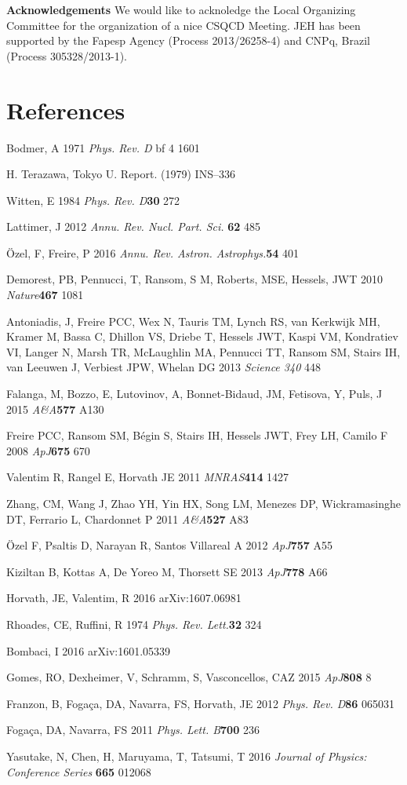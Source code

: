 \documentclass[a4paper]{jpconf}
\begin{document}
\bigskip
\noindent
{\bf Acknowledgements}
We would like to acknoledge the Local Organizing Committee for the organization of a nice CSQCD Meeting. JEH has been 
supported by the Fapesp Agency (Process 2013/26258-4) and CNPq, Brazil (Process 305328/2013-1).

\section*{References}

\noindent
[1] Bodmer, A 1971 {\it Phys. Rev. D} {bf 4} 1601

\noindent
[2] H. Terazawa, Tokyo U. Report. (1979) INS–336

\noindent
[3] Witten, E 1984 {\it Phys. Rev. D}{\bf 30} 272

\noindent
[4] Lattimer, J 2012 {\it Annu. Rev. Nucl. Part. Sci.} {\bf 62} 485 

\noindent
[5] \"Ozel, F, Freire, P 2016 {\it Annu. Rev. Astron. Astrophys.}{\bf 54} 401

\noindent
[6] Demorest, PB, Pennucci, T, Ransom, S M, Roberts, MSE, Hessels, JWT 2010 {\it Nature}{\bf 467} 1081

\noindent
[7] Antoniadis, J, Freire PCC, Wex N, Tauris TM, Lynch RS, van Kerkwijk MH, Kramer M, Bassa C, 
Dhillon VS, Driebe T, Hessels JWT, Kaspi VM, Kondratiev VI, Langer N, Marsh TR, McLaughlin MA, 
Pennucci TT, Ransom SM, Stairs IH, van Leeuwen J, Verbiest JPW, Whelan DG 2013 {\it Science 340} 448

\noindent
[8] Falanga, M, Bozzo, E, Lutovinov, A, Bonnet-Bidaud, JM, Fetisova, Y, Puls, J 2015 {\it A\&A}{\bf 577} A130

\noindent
[9] Freire PCC, Ransom SM, Bégin S, Stairs IH, Hessels JWT, Frey LH, Camilo F 2008 {\it ApJ}{\bf 675} 670

\noindent
[10] Valentim R, Rangel E, Horvath JE 2011 {\it MNRAS}{\bf 414} 1427

\noindent
[11] Zhang, CM, Wang J, Zhao YH, Yin HX, Song LM, Menezes DP, Wickramasinghe DT, Ferrario L, Chardonnet P 2011 {\it A\&A}{\bf 527} A83 

\noindent
[12] \"Ozel F, Psaltis D, Narayan R, Santos Villareal A 2012 {\it ApJ}{\bf 757} A55

\noindent
[13] Kiziltan B, Kottas A, De Yoreo M, Thorsett SE 2013 {\it ApJ}{\bf 778} A66

\noindent
[14] Horvath, JE, Valentim, R 2016 arXiv:1607.06981

\noindent
[15] Rhoades, CE, Ruffini, R 1974 {\it Phys. Rev. Lett.}{\bf 32} 324

\noindent
[16] Bombaci, I 2016 arXiv:1601.05339

\noindent
[17] Gomes, RO,  Dexheimer, V, Schramm, S, Vasconcellos, CAZ 2015 {\it ApJ}{\bf 808} 8

\noindent
[18]  Franzon, B, Foga\c ca, DA, Navarra, FS, Horvath, JE 2012 {\it Phys. Rev. D}{\bf 86} 065031

\noindent
[19] Foga\c ca, DA, Navarra, FS 2011 {\it Phys. Lett. B}{\bf 700} 236

\noindent
[20] Yasutake, N, Chen, H, Maruyama, T, Tatsumi, T 2016 {\it Journal of Physics: Conference Series} {\bf 665} 012068 
\end{document}

